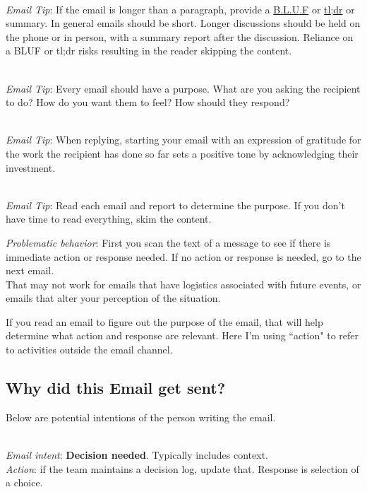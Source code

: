 \ \\
\textit{Email Tip}: If the email is longer than a paragraph, provide a \href{https://en.wikipedia.org/wiki/BLUF_(communication)}{B.L.U.F} 
or 
\href{https://en.wikipedia.org/wiki/Wikipedia:Too_long;_didn\%27t_read}{tl;dr} 
or summary. In general emails should be short. Longer discussions should be held on the phone or in person, with a summary report after the discussion. Reliance on a BLUF or tl;dr risks resulting in the reader skipping the content. 

\ \\
\textit{Email Tip}: Every email should have a purpose. What are you asking the recipient to do? How do you want them to feel? How should they respond?

\ \\
\textit{Email Tip}: When replying, starting your email with an expression of gratitude for the work the recipient has done so far sets a positive tone by acknowledging their investment.

\ \\
\textit{Email Tip}: Read each email and report to determine the purpose. If you don't have time to read everything, skim the content. 

\textit{Problematic behavior}: First you scan the text of a message to see if there is immediate action or response needed. If no action or response is needed, go to the next email. \\
That may not work for emails that have logistics associated with future events, or emails that alter your perception of the situation.


If you read an email to figure out the purpose of the email, that will help determine what action and response are relevant. Here I'm using ``action" to refer to activities outside the email channel. 


\subsection*{Why did this Email get sent?}
Below are potential intentions of the person writing the email. 

\ \\
\textit{Email intent}: \textbf{Decision needed}. Typically includes context. \\
\textit{Action}: if the team maintains a decision log, update that.
Response is selection of a choice.

